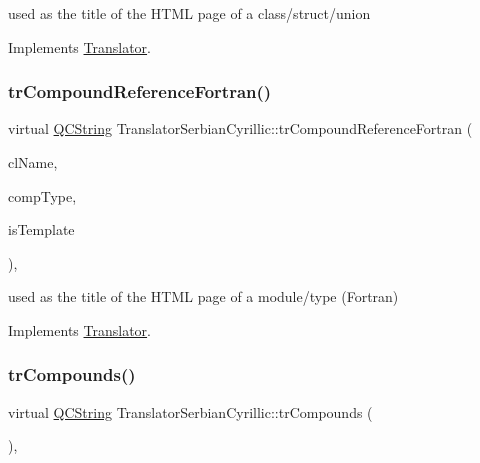 used as the title of the H\+T\+ML page of a class/struct/union 

Implements \mbox{\hyperlink{class_translator}{Translator}}.

\mbox{\label{class_translator_serbian_cyrillic_a9a6e2df763f874c758d6e0878950d79d}} 
\subsubsection{\texorpdfstring{trCompoundReferenceFortran()}{trCompoundReferenceFortran()}}
{\footnotesize\ttfamily virtual \mbox{\hyperlink{class_q_c_string}{Q\+C\+String}} Translator\+Serbian\+Cyrillic\+::tr\+Compound\+Reference\+Fortran (\begin{DoxyParamCaption}\item[{const char $\ast$}]{cl\+Name,  }\item[{\mbox{\hyperlink{class_class_def_ae70cf86d35fe954a94c566fbcfc87939}{Class\+Def\+::\+Compound\+Type}}}]{comp\+Type,  }\item[{bool}]{is\+Template }\end{DoxyParamCaption})\hspace{0.3cm}{\ttfamily [inline]}, {\ttfamily [virtual]}}

used as the title of the H\+T\+ML page of a module/type (Fortran) 

Implements \mbox{\hyperlink{class_translator}{Translator}}.

\mbox{\label{class_translator_serbian_cyrillic_a2e7125c02a430c5e9a401e162108992f}} 
\subsubsection{\texorpdfstring{trCompounds()}{trCompounds()}}
{\footnotesize\ttfamily virtual \mbox{\hyperlink{class_q_c_string}{Q\+C\+String}} Translator\+Serbian\+Cyrillic\+::tr\+Compounds (\begin{DoxyParamCaption}{ }\end{DoxyParamCaption})\hspace{0.3cm}{\ttfamily [inline]}, {\ttfamily [virtual]}}

